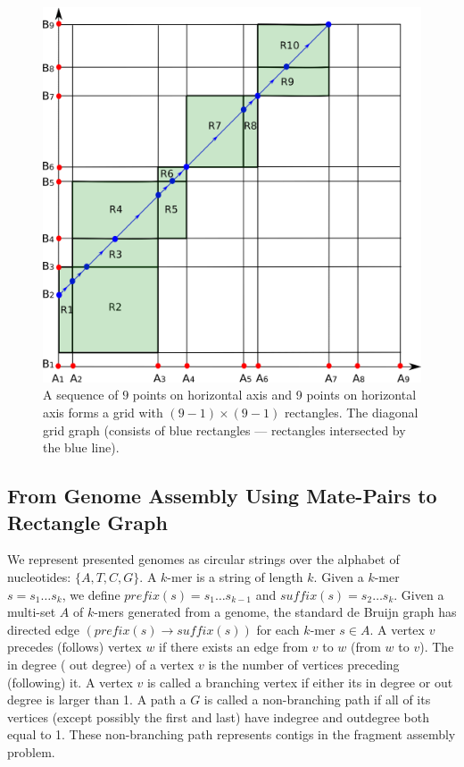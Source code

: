 \documentclass[a4paper]{article}
\begin{document}
\begin{figure}
\includegraphics[scale=0.3]{fig/gridGraph.eps}
\caption{A sequence of $9$ points on horizontal axis and 9 points on horizontal axis forms a grid with $(9-1) \times (9-1)$ rectangles.
The diagonal grid graph (consists of blue rectangles --- rectangles intersected by the blue line). }
\end{figure}


\subsection{From Genome Assembly Using Mate-Pairs to Rectangle Graph}

We represent presented genomes as circular strings over the alphabet of nucleotides: $\{A,T,C,G\}$. 
A $k$-mer is a string of length $k$.
Given a $k$-mer $s = s_1\ldots s_k$,
we define $prefix(s)= s_1\ldots s_{k-1}$ and $suffix(s) = s_2\ldots s_k$. Given a multi-set $A$ of $k$-mers generated from a genome, 
the standard de Bruijn graph has directed edge $(prefix(s) \rightarrow suffix(s))$
for each $k$-mer $s\in A$.  A vertex $v$  precedes (follows) vertex $w$ if there exists an edge from $v$ to $w$ (from $w$ to $v$). The in degree ( out degree)  of a vertex 
$v$ is the number of vertices preceding (following) it.  A vertex $v$ is called a branching vertex if either its in degree or out degree is larger than 1. A path a $G$ is called a non-branching path if all of its vertices (except possibly the first and last) have indegree and outdegree
both equal to 1. These non-branching path represents contigs in the fragment assembly problem.
\end{document}

